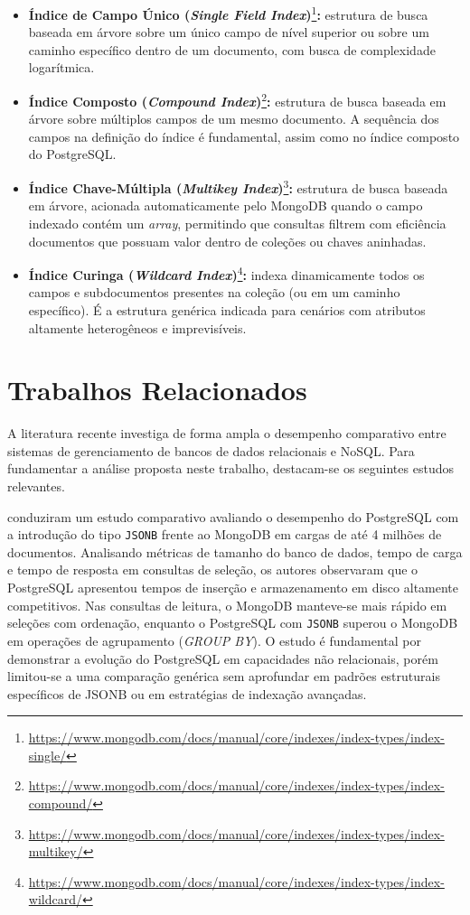 \begin{itemize}
    \item \textbf{Índice de Campo Único (\textit{Single Field Index})}\footnote{\url{https://www.mongodb.com/docs/manual/core/indexes/index-types/index-single/}}\textbf{:} estrutura de busca baseada em árvore sobre um único campo de nível superior ou sobre 
    um caminho específico dentro de um documento, com busca de complexidade logarítmica.
    
    \item \textbf{Índice Composto (\textit{Compound Index})}\footnote{\url{https://www.mongodb.com/docs/manual/core/indexes/index-types/index-compound/}}\textbf{:} estrutura de busca baseada em árvore sobre múltiplos campos de um mesmo documento. 
    A sequência dos campos na definição do índice é fundamental, assim como no índice composto do PostgreSQL.
    
    \item \textbf{Índice Chave-Múltipla (\textit{Multikey Index})}\footnote{\url{https://www.mongodb.com/docs/manual/core/indexes/index-types/index-multikey/}}\textbf{:} estrutura de busca baseada em árvore, acionada automaticamente pelo MongoDB quando o campo indexado contém um \textit{array}, 
    permitindo que consultas filtrem com eficiência documentos que possuam valor dentro de coleções ou chaves aninhadas.

    \item \textbf{Índice Curinga (\textit{Wildcard Index})}\footnote{\url{https://www.mongodb.com/docs/manual/core/indexes/index-types/index-wildcard/}}\textbf{:} indexa dinamicamente todos os campos e subdocumentos presentes na coleção (ou em um caminho específico). É a estrutura genérica indicada para cenários com atributos altamente 
    heterogêneos e imprevisíveis.
\end{itemize}


\section{Trabalhos Relacionados}

A literatura recente investiga de forma ampla o desempenho comparativo entre sistemas de gerenciamento de bancos de dados relacionais e NoSQL. Para fundamentar a análise proposta neste trabalho, destacam-se os seguintes estudos relevantes.

 conduziram um estudo comparativo avaliando o desempenho do PostgreSQL com a introdução do tipo \texttt{JSONB} frente ao MongoDB em cargas de até 4 milhões de documentos. Analisando métricas de tamanho do banco de dados, tempo de carga e tempo de resposta em consultas de seleção, os autores observaram que o PostgreSQL apresentou tempos de inserção e armazenamento em disco altamente competitivos. Nas consultas de leitura, o MongoDB manteve-se mais rápido em seleções com ordenação, enquanto o PostgreSQL com \texttt{JSONB} superou o MongoDB em operações de agrupamento (\textit{GROUP BY}). O estudo é fundamental por demonstrar a evolução do PostgreSQL em capacidades não relacionais, porém limitou-se a uma comparação genérica sem aprofundar em padrões estruturais específicos de JSONB ou em estratégias de indexação avançadas.

